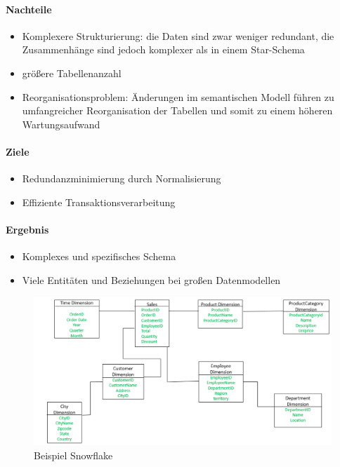 \paragraph{Nachteile}
\begin{itemize}
    \item Komplexere Strukturierung: die Daten sind zwar weniger redundant, die Zusammenhänge sind jedoch komplexer als in einem Star-Schema
    \item größere Tabellenanzahl
    \item Reorganisationsproblem: Änderungen im semantischen Modell führen \newline zu umfangreicher Reorganisation der Tabellen und somit zu einem höheren Wartungsaufwand

\end{itemize}

\paragraph{Ziele}
\begin{itemize}
    \item Redundanzminimierung durch Normalisierung
    \item Effiziente Transaktionsverarbeitung

\end{itemize}

\paragraph{Ergebnis}
\begin{itemize}
    \item Komplexes und spezifisches Schema
    \item Viele Entitäten und Beziehungen bei großen Datenmodellen

\end{itemize}

\begin{figure}[h]
    \centering
    \includegraphics[width=.8\textwidth]{Content/images/modellierung/starb.png}
    \caption{Beispiel Snowflake}
    \label{fig:modellierung:starb}
\end{figure}

